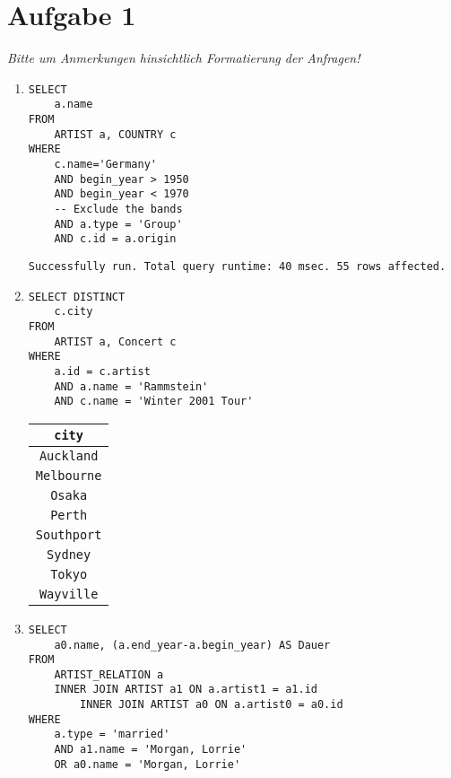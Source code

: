 \documentclass{article}
\begin{document}
    \section*{Aufgabe 1}
    \emph{Bitte um Anmerkungen hinsichtlich Formatierung der Anfragen!}
    \begin{enumerate}
        \item
            \begin{verbatim}
SELECT
    a.name
FROM
    ARTIST a, COUNTRY c
WHERE
    c.name='Germany'
    AND begin_year > 1950
    AND begin_year < 1970
    -- Exclude the bands
    AND a.type = 'Group'
    AND c.id = a.origin
            \end{verbatim}
        \texttt{Successfully run. Total query runtime: 40 msec. 55 rows affected.}
        \item
            \begin{verbatim}
SELECT DISTINCT
    c.city
FROM
    ARTIST a, Concert c
WHERE
    a.id = c.artist
    AND a.name = 'Rammstein'
    AND c.name = 'Winter 2001 Tour'
            \end{verbatim}
            \begin{tabular}{|c|}
                \texttt{city} \\
                \toprule
                \texttt{Auckland} \\
                \texttt{Melbourne} \\
                \texttt{Osaka} \\
                \texttt{Perth} \\
                \texttt{Southport} \\
                \texttt{Sydney} \\
                \texttt{Tokyo} \\
                \texttt{Wayville} \\
            \end{tabular}

        \item
            \begin{verbatim}
SELECT
    a0.name, (a.end_year-a.begin_year) AS Dauer
FROM
    ARTIST_RELATION a
    INNER JOIN ARTIST a1 ON a.artist1 = a1.id
        INNER JOIN ARTIST a0 ON a.artist0 = a0.id
WHERE
    a.type = 'married'
    AND a1.name = 'Morgan, Lorrie'
    OR a0.name = 'Morgan, Lorrie'
            \end{verbatim}


\end{enumerate}
\end{document}

